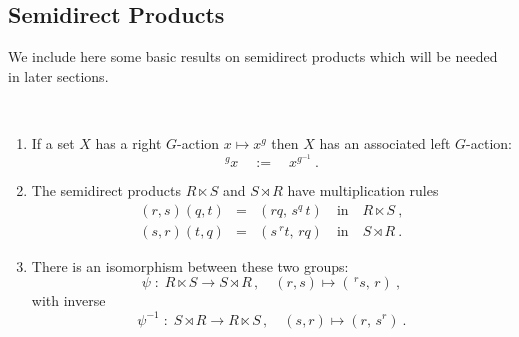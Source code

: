 
\subsection{Semidirect Products} \label{subs:sdp}

We include here some basic results on semidirect products
which will be needed in later sections.

\begin{prop}\quad\\
\vspace{-3mm}
\begin{enumerate}[{\rm (a)}]
\item
If a set  $X$  has a right  $G$-action  $x \mapsto x^g$
then $X$ has an associated left $G$-action:
$$
{}^g\!x \quad := \quad x^{g^{-1}}~.
$$
\item
The semidirect products  $R \ltimes S$  and  $S \rtimes R$
have multiplication rules
\begin{eqnarray*}
(r,s)(q,t)  & = &  (rq,\,s^q\,t) \quad\mbox{in}\quad R \ltimes S~, \\
(s,r)(t,q)  & = &  (s\,{}^r\!t,\,rq) \quad\mbox{in}\quad S \rtimes R~.
\end{eqnarray*}
\item
There is an isomorphism between these two groups:
$$
\psi \;:\; R \ltimes S \to S \rtimes R\,,
\quad (r,s) \mapsto (\,{}^r\!s,\,r)~,
$$
with inverse
$$
\psi^{-1} \;:\; S \rtimes R \to R \ltimes S\,,
\quad (s,r) \mapsto (r,\,s^r)~.
$$
\end{enumerate}
\end{prop}
